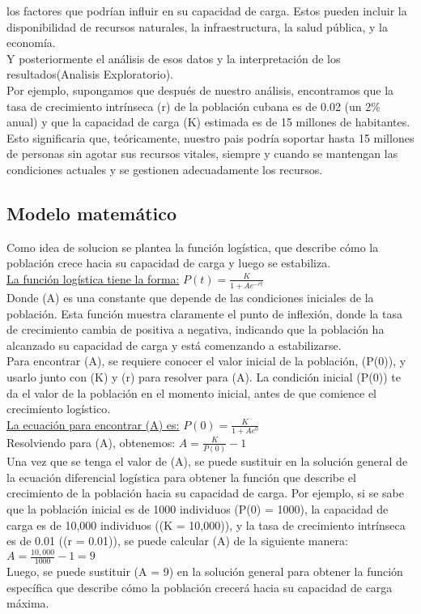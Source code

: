 \documentclass[a4paper,10pt,twocolumn]{article}
\begin{document}
los factores que podrían influir en su capacidad de carga. Estos pueden incluir la disponibilidad de recursos 
naturales, la infraestructura, la salud pública, y la economía.\\
Y posteriormente el análisis de esos datos y la interpretación de los resultados(Analisis Exploratorio).\\
Por ejemplo, supongamos que después de nuestro análisis, encontramos que la tasa de crecimiento intrínseca (r) de la población 
cubana es de 0.02 (un 2\% anual) y que la capacidad de carga (K) estimada es de 15 millones de habitantes. 
Esto significaria que, teóricamente, nuestro pais podría soportar hasta 15 millones de personas sin agotar sus recursos 
vitales, siempre y cuando se mantengan las condiciones actuales y se gestionen adecuadamente los recursos.

	\subsection{Modelo matemático}\label{sub:math}
Como idea de solucion se plantea la función logística, que describe cómo la población crece hacia su capacidad de 
carga y luego se estabiliza.\\ 
\underline{La función logística tiene la forma:} $P(t) = \frac{K}{1 + Ae^{-rt}}$ \\
Donde (A) es una constante que depende de las condiciones iniciales de la población. Esta función muestra claramente 
el punto de inflexión, donde la tasa de crecimiento cambia de positiva a negativa, indicando que la población 
ha alcanzado su capacidad de carga y está comenzando a estabilizarse.\\
Para encontrar (A), se requiere conocer el valor inicial de la población, (P(0)), y usarlo junto con (K) y (r) 
para resolver para (A). La condición inicial (P(0)) te da el valor de la población en el momento inicial, antes de 
que comience el crecimiento logístico.\\
\underline{La ecuación para encontrar (A) es:} $P(0) = \frac{K}{1 + Ae^{0}}$\\
Resolviendo para (A), obtenemos: $A = \frac{K}{P(0)} - 1$\\
Una vez que se tenga el valor de (A), se puede sustituir en la solución general de la ecuación diferencial 
logística para obtener la función que describe el crecimiento de la población hacia su capacidad de carga.
Por ejemplo, si se sabe que la población inicial es de 1000 individuos (P(0) = 1000), la capacidad de carga 
es de 10,000 individuos ((K = 10,000)), y la tasa de crecimiento intrínseca es de 0.01 ((r = 0.01)), 
se puede calcular (A) de la siguiente manera:\\
$A = \frac{10,000}{1000} - 1 = 9$\\
Luego, se puede sustituir (A = 9) en la solución general para obtener la función específica que describe cómo la 
población crecerá hacia su capacidad de carga máxima.\\\\
\end{document}
